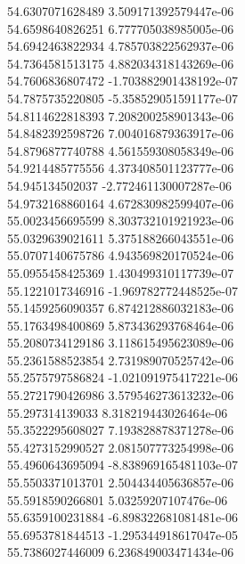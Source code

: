 {54.6307071628489 3.509171392579447e-06 \\
54.6598640826251 6.777705038985005e-06 \\
54.6942463822934 4.785703822562937e-06 \\
54.7364581513175 4.882034318143269e-06 \\
54.7606836807472 -1.703882901438192e-07 \\
54.7875735220805 -5.358529051591177e-07 \\
54.8114622818393 7.208200258901343e-06 \\
54.8482392598726 7.004016879363917e-06 \\
54.8796877740788 4.561559308058349e-06 \\
54.9214485775556 4.373408501123777e-06 \\
54.945134502037 -2.772461130007287e-06 \\
54.9732168860164 4.672830982599407e-06 \\
55.0023456695599 8.303732101921923e-06 \\
55.0329639021611 5.375188266043551e-06 \\
55.0707140675786 4.943569820170524e-06 \\
55.0955458425369 1.430499310117739e-07 \\
55.1221017346916 -1.969782772448525e-07 \\
55.1459256090357 6.874212886032183e-06 \\
55.1763498400869 5.873436293768464e-06 \\
55.2080734129186 3.118615495623089e-06 \\
55.2361588523854 2.731989070525742e-06 \\
55.2575797586824 -1.021091975417221e-06 \\
55.2721790426986 3.579546273613232e-06 \\
55.297314139033 8.318219443026464e-06 \\
55.3522295608027 7.193828878371278e-06 \\
55.4273152990527 2.081507773254998e-06 \\
55.4960643695094 -8.838969165481103e-07 \\
55.5503371013701 2.504434405636857e-06 \\
55.5918590266801 5.03259207107476e-06 \\
55.6359100231884 -6.898322681081481e-06 \\
55.6953781844513 -1.295344918617047e-05 \\
55.7386027446009 6.236849003471434e-06 \\
}
